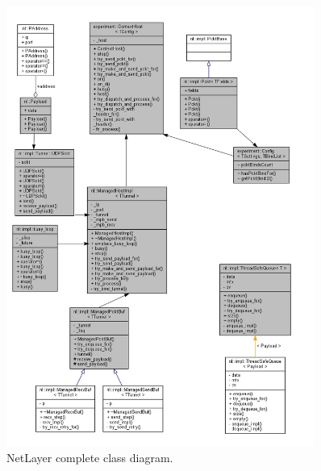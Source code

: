 \documentclass[12pt]{report}
\newcommand{\+}{\discretionary{\mbox{\scriptsize$\hookleftarrow$}}{}{}}
\begin{document}
                \begin{figure}[H]
                \caption{NetLayer complete class diagram.}
                \centering
                \includegraphics[width=0.9\textwidth]{d/coll/src.png}
                \end{figure}

                \newpage
\end{document}
